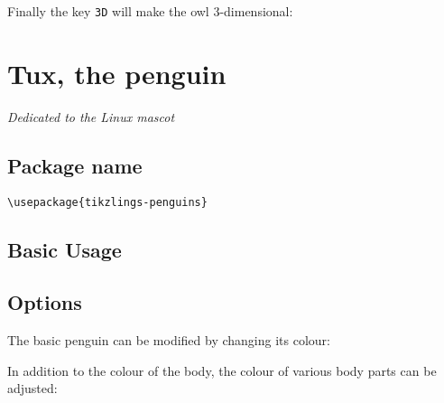 \documentclass[parskip=half]{scrartcl}
\begin{document}
Finally the key \lstinline|3D| will make the owl 3-dimensional:
\begin{tcblisting}{}
\owl[3D]
\end{tcblisting}

%
%
\clearpage
\section[Penguin]{Tux, the penguin}

\emph{Dedicated to the Linux mascot}


\subsection{Package name}

\begin{tcolorbox}[lower separated=false, lefthand width=.8\linewidth]
\vspace*{0.5cm}
\lstinline|\usepackage{tikzlings-penguins}| 
\vspace*{0.5cm}
\end{tcolorbox}

\subsection{Basic Usage}

\begin{tcblisting}{}
\penguin
\end{tcblisting}

\subsection{Options}

The basic penguin can be modified by changing its colour:
\begin{tcblisting}{}
\penguin[body=blue]
\end{tcblisting}

In addition to the colour of the body, the colour of various body parts can be adjusted:
\begin{tcblisting}{}
\penguin[eye=red]
\end{tcblisting}
\begin{tcblisting}{}
\penguin[pupil=red]
\end{tcblisting}
\begin{tcblisting}{}
\penguin[bill=red]
\end{tcblisting}
\begin{tcblisting}{}
\penguin[belly=red]
\end{tcblisting}
\begin{tcblisting}{}
\penguin[feet=red]
\end{tcblisting}
\end{document}
